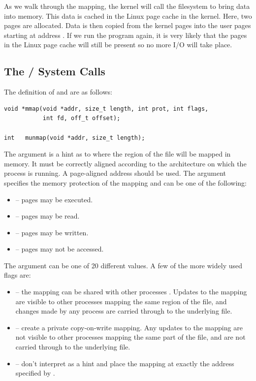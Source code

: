 As we walk through the mapping, the kernel will call the filesystem to bring data into memory. This data is cached in the Linux page cache in the kernel. Here, two pages are allocated. Data is then copied from the kernel pages into the user pages starting at address . If we run the program again, it is very likely that the pages in the Linux page cache will still be present so no more I/O will take place.


\subsection{The  /  System Calls}

The definition of  and  are as follows:

\begin{lstlisting}
void *mmap(void *addr, size_t length, int prot, int flags,
           int fd, off_t offset);
			  
int   munmap(void *addr, size_t length);
\end{lstlisting}

\noindent
The  argument is a hint as to where the region of the file will be mapped in memory. It must be correctly aligned according to the architecture on which the process is running. A page-aligned address should be used. The  argument specifies the memory protection of the mapping and can be one of the following:

\begin{itemize}
	\item {} -- pages may be executed.
	\item {} -- pages may be read.
	\item {} -- pages may be written.
	\item {} -- pages may not be accessed.
\end{itemize}

\noindent
The  argument can be one of 20 different values. A few of the more widely used flags are:

\begin{itemize}
	\item {} -- the mapping can be shared with other processes .  Updates to the mapping are visible to other
              processes  mapping  the  same  region of the file, and changes made by any process are carried through to the 
              underlying  file.
	\item {} -- create a private copy-on-write mapping.  Any updates to the  mapping
              are  not  visible  to other processes mapping the same part of the file, and are not carried through to the underlying file.  
	\item {} -- don't interpret  as a hint and place  the  mapping  at  exactly the address specified 
		by .
\end{itemize}

